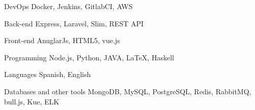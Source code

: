 

\begin{cvskills}

  \cvskill
    {DevOps} %
    {Docker, Jenkins, GitlabCI, AWS} %

  \cvskill
    {Back-end} %
    {Express, Laravel, Slim, REST API} %

  \cvskill
    {Front-end} %
    {AnuglarJs, HTML5, vue.js} %

  \cvskill
    {Programming} %
    {Node.js, Python, JAVA, \LaTeX, Haskell} %

  \cvskill
    {Languages} %
    {Spanish, English} %

  \cvskill
    {Databases and other tools} %
    {MongoDB, MySQL, PostgreSQL, Redis, RabbitMQ, bull.js, Kue, ELK} %

\end{cvskills}
